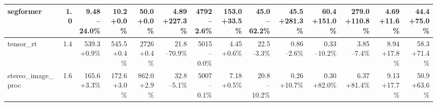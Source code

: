 \begin{table}[t]
{\begin{tabular}{lrrrrrrrrrrrrr}
\midrule
segformer & 1.0 & \makecell[r]{9.48\\--24.0\%} & \makecell[r]{10.2\\+0.0\%} & \makecell[r]{50.0\\+0.0\%} & \makecell[r]{4.89\\+227.3\%} & \makecell[r]{4792\\--2.6\%} & \makecell[r]{153.0\\+33.5\%} & \makecell[r]{45.0\\--62.2\%} & \makecell[r]{45.5\\+281.3\%} & \makecell[r]{60.4\\+151.0\%} & \makecell[r]{279.0\\+110.8\%} & \makecell[r]{4.69\\+11.6\%} & \makecell[r]{44.4\\+75.0\%} \\
\midrule
tensor\_rt & 1.4 & \makecell[r]{539.3\\+0.9\%} & \makecell[r]{545.5\\+0.4\%} & \makecell[r]{2726\\+0.4\%} & \makecell[r]{21.8\\--70.9\%} & \makecell[r]{5015\\--0.0\%} & \makecell[r]{4.45\\+0.6\%} & \makecell[r]{22.5\\--3.3\%} & \makecell[r]{0.86\\--2.6\%} & \makecell[r]{0.33\\--10.2\%} & \makecell[r]{3.85\\--7.4\%} & \makecell[r]{8.94\\+17.8\%} & \makecell[r]{58.3\\+71.4\%} \\
\midrule
stereo\_image\_proc & 1.6 & \makecell[r]{165.6\\+3.3\%} & \makecell[r]{172.6\\+3.0\%} & \makecell[r]{862.0\\+2.9\%} & \makecell[r]{32.8\\--5.1\%} & \makecell[r]{5007\\--0.1\%} & \makecell[r]{7.18\\+0.5\%} & \makecell[r]{20.8\\--10.2\%} & \makecell[r]{0.26\\+10.7\%} & \makecell[r]{0.30\\+82.0\%} & \makecell[r]{6.37\\+81.4\%} & \makecell[r]{9.13\\+17.7\%} & \makecell[r]{50.9\\+63.6\%} \\

\end{tabular}}
\end{table}
